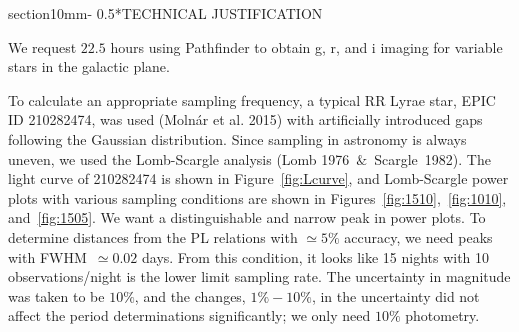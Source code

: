 \documentclass[letterpaper,11pt]{article}
\makeatletter
\renewcommand{\section}{\@startsection%
{section}{1}{0mm}{-\baselineskip}%
{0.5\baselineskip}{\normalfont\Large\bfseries}}%
\makeatother
\begin{document}
\clearpage
\section*{TECHNICAL JUSTIFICATION}


We request $22.5$ hours using Pathfinder to obtain g, r, and i imaging for variable stars in the galactic plane.

\vspace{3mm} %

\noindent To calculate an appropriate sampling frequency, a typical RR Lyrae star, EPIC ID 210282474, was used (Molnár et al. 2015) with artificially introduced gaps following the Gaussian distribution. Since sampling in astronomy is always uneven, we used the Lomb-Scargle analysis (Lomb 1976~$\&$~Scargle~1982). The light curve of 210282474 is shown in Figure~\ref{fig:Lcurve}, and Lomb-Scargle power plots with various sampling conditions are shown in Figures~\ref{fig:1510},~\ref{fig:1010}, and~\ref{fig:1505}. We want a distinguishable and narrow peak in power plots. To determine distances from the PL relations with $\simeq5\%$ accuracy, we need peaks with FWHM~$ \simeq 0.02$ days. From this condition, it looks like 15 nights with 10 observations/night is the lower limit sampling rate. The uncertainty in magnitude was taken to be $10\%$, and the changes, $1\% - 10\%$, in the uncertainty did not affect the period determinations significantly; we only need $10\%$ photometry.
\end{document}
